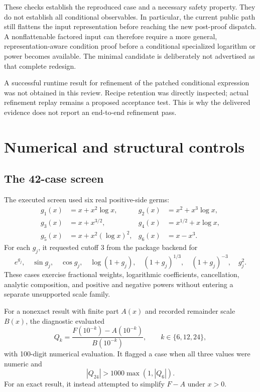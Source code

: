 \documentclass[11pt,letterpaper]{article}
\begin{document}
These checks establish the reproduced case and a necessary safety property. They do not establish all conditional observables. In particular, the current public path still flattens the input representation before reaching the new post-proof dispatch. A nonflattenable factored input can therefore require a more general, representation-aware condition proof before a conditional specialized logarithm or power becomes available. The minimal candidate is deliberately not advertised as that complete redesign.

A successful runtime result for refinement of the patched conditional expression was not obtained in this review. Recipe retention was directly inspected; actual refinement replay remains a proposed acceptance test. This is why the delivered evidence does not report an end-to-end refinement pass.

\section{Numerical and structural controls}
\label{sec:controls}

\subsection{The 42-case screen}

The executed screen used six real positive-side germs:
\begin{align*}
 g_1(x)&=x+x^2\log x,& g_2(x)&=x^2+x^3\log x,\\
 g_3(x)&=x+x^{3/2},&g_4(x)&=x^{1/2}+x\log x,\\
 g_5(x)&=x+x^2(\log x)^2,&g_6(x)&=x-x^3.
\end{align*}
For each $g_j$, it requested cutoff $3$ from the package backend for
\[
 e^{g_j},\quad \sin g_j,\quad \cos g_j,\quad\log(1+g_j),\quad
 (1+g_j)^{1/3},\quad(1+g_j)^{-3},\quad g_j^2.
\]
These cases exercise fractional weights, logarithmic coefficients, cancellation, analytic composition, and positive and negative powers without entering a separate unsupported scale family.

For a nonexact result with finite part $A(x)$ and recorded remainder scale $B(x)$, the diagnostic evaluated
\begin{equation}
 Q_k=\frac{F(10^{-k})-A(10^{-k})}{B(10^{-k})},
 \qquad k\in\{6,12,24\},
\label{eq:screen}
\end{equation}
with 100-digit numerical evaluation. It flagged a case when all three values were numeric and
\[
 |Q_{24}|>1000\max(1,|Q_6|).
\]
For an exact result, it instead attempted to simplify $F-A$ under $x>0$.
\end{document}
